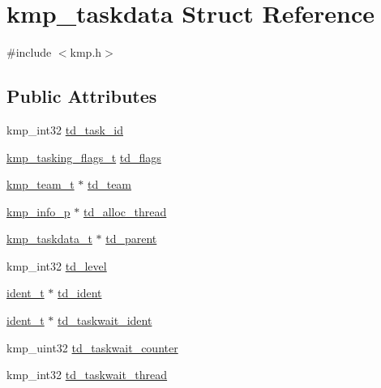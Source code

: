 \hypertarget{structkmp__taskdata}{\section{kmp\-\_\-taskdata Struct Reference}
\label{structkmp__taskdata}
}


{\ttfamily \#include $<$kmp.\-h$>$}

\subsection*{Public Attributes}
\begin{DoxyCompactItemize}
\item 
kmp\-\_\-int32 \hyperlink{structkmp__taskdata_a5e7bd3946ccea8fd5789f703a628344f}{td\-\_\-task\-\_\-id}
\item 
\hyperlink{kmp_8h_aae6caf584826156e4957a68682e38420}{kmp\-\_\-tasking\-\_\-flags\-\_\-t} \hyperlink{structkmp__taskdata_aa6380b6723d2482345a1e6cffcd15e9f}{td\-\_\-flags}
\item 
\hyperlink{kmp_8h_a95f7a64bda9b774add6c27c4a7b2a143}{kmp\-\_\-team\-\_\-t} $\ast$ \hyperlink{structkmp__taskdata_a2ca48086b6f95cea53c615b83a94e424}{td\-\_\-team}
\item 
\hyperlink{kmp_8h_ac18028528c26006f57fea477167d447e}{kmp\-\_\-info\-\_\-p} $\ast$ \hyperlink{structkmp__taskdata_a7b8d9a186786bc69e6883d4120553c10}{td\-\_\-alloc\-\_\-thread}
\item 
\hyperlink{kmp_8h_af73aa077ec760ca83750f8144a5e65fb}{kmp\-\_\-taskdata\-\_\-t} $\ast$ \hyperlink{structkmp__taskdata_a47e9134b90866241cb795112acf9dabb}{td\-\_\-parent}
\item 
kmp\-\_\-int32 \hyperlink{structkmp__taskdata_a1dce0edb2ca087c66580ff685fae081a}{td\-\_\-level}
\item 
\hyperlink{group__BASIC__TYPES_ga690fda6b92f039a72db263c6b4394ddb}{ident\-\_\-t} $\ast$ \hyperlink{structkmp__taskdata_a80a962f07e81cde9797d70decdd6119d}{td\-\_\-ident}
\item 
\hyperlink{group__BASIC__TYPES_ga690fda6b92f039a72db263c6b4394ddb}{ident\-\_\-t} $\ast$ \hyperlink{structkmp__taskdata_a11ddd31b5102384ab645eef338e40bf3}{td\-\_\-taskwait\-\_\-ident}
\item 
kmp\-\_\-uint32 \hyperlink{structkmp__taskdata_a11a22c35abf51fc2e20a7559001a1e72}{td\-\_\-taskwait\-\_\-counter}
\item 
kmp\-\_\-int32 \hyperlink{structkmp__taskdata_a9721521ef95aac2b984b2ee053c3be9a}{td\-\_\-taskwait\-\_\-thread}

\end{DoxyCompactItemize}

